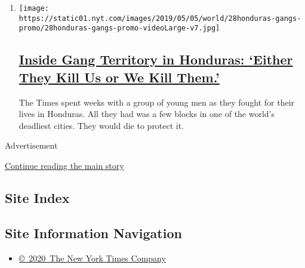 \begin{enumerate}
\def\labelenumi{\arabic{enumi}.}
\item
  \texttt{[image: https://static01.nyt.com/images/2019/05/05/world/28honduras-gangs-promo/28honduras-gangs-promo-videoLarge-v7.jpg]}

  \hypertarget{inside-gang-territory-in-honduras-either-they-kill-us-or-we-kill-them}{%
  \subsection{\texorpdfstring{\href{/interactive/2019/05/04/world/americas/honduras-gang-violence.html}{Inside
  Gang Territory in Honduras: `Either They Kill Us or We Kill
  Them.'}}{Inside Gang Territory in Honduras: `Either They Kill Us or We Kill Them.'}}\label{inside-gang-territory-in-honduras-either-they-kill-us-or-we-kill-them}}

  The Times spent weeks with a group of young men as they fought for
  their lives in Honduras. All they had was a few blocks in one of the
  world's deadliest cities. They would die to protect it.
\end{enumerate}

Advertisement

\protect\hyperlink{after-mid1}{Continue reading the main story}

\hypertarget{site-index}{%
\subsection{Site Index}\label{site-index}}

\hypertarget{site-information-navigation}{%
\subsection{Site Information
Navigation}\label{site-information-navigation}}

\begin{itemize}
\tightlist
\item
  \href{https://help.nytimes.com/hc/en-us/articles/115014792127-Copyright-notice}{©~2020~The
  New York Times Company}
\end{itemize}

